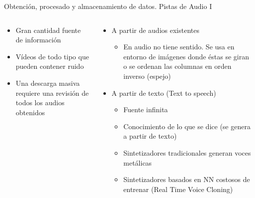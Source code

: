 \begin{frame}[t]{Obtención, procesado y almacenamiento de datos. Pistas de Audio I}
	\begin{table} [h!]
		\centering
	\end{table}
	\begin{columns}
		\begin{column}{0.5\textwidth}
			\centering
			\vspace*{-10pt}
			\begin{itemize}
				\item {}Gran cantidad fuente de información
				\item {}Vídeos de todo tipo que pueden contener ruido
				\item {}Una descarga masiva requiere una revisión de todos los audios obtenidos
			\end{itemize}
		\end{column}
		\vrule{}
		\begin{column}[t]{0.5\textwidth}
			\vspace*{-40pt}
			\begin{itemize}
				\item A partir de audios existentes
				\begin{itemize}
					\scriptsize
					\item {}En audio no tiene sentido. Se usa en entorno de imágenes donde éstas se giran o se ordenan las columnas en orden inverso (espejo)
				\end{itemize}
				\item A partir de texto (Text to speech)
				\begin{itemize}
					\scriptsize
					\item {}Fuente infinita
					\item {}Conocimiento de lo que se dice (se genera a partir de texto)
					\item {}Sintetizadores tradicionales generan voces metálicas
					\item {}Sintetizadores basados en NN costosos de entrenar (Real Time Voice Cloning)
				\end{itemize}
			\end{itemize}
		\end{column}
	\end{columns}
\end{frame}
